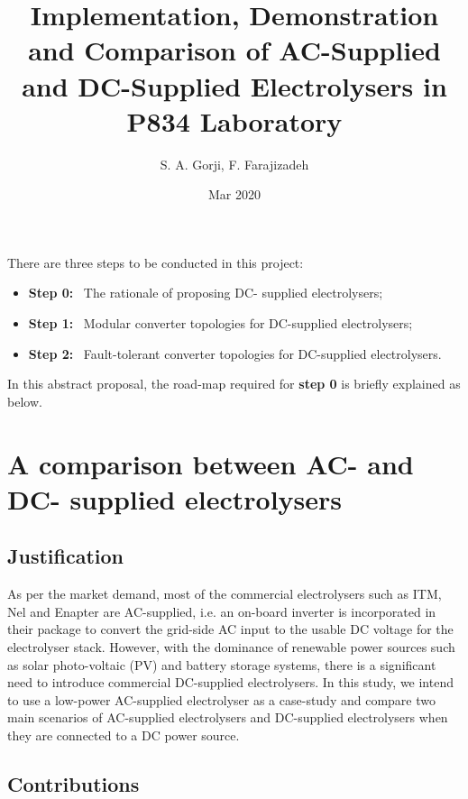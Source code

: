 \documentclass[1pt]{extarticle}
\title{Implementation, Demonstration and Comparison of AC-Supplied and DC-Supplied Electrolysers in P834 Laboratory}
\author{S. A. Gorji, F. Farajizadeh}
\date{Mar 2020}
\begin{document}
\maketitle

There are three steps to be conducted in this project:

\begin{itemize}
  \item \textbf{Step 0:}~ The rationale of proposing DC- supplied electrolysers;
  \item \textbf{Step 1:}~ Modular converter topologies for DC-supplied electrolysers;
  \item \textbf{Step 2:}~ Fault-tolerant converter topologies for DC-supplied electrolysers.
\end{itemize}

In this abstract proposal, the road-map required for \textbf{step 0} is briefly explained as below.

\section{A comparison between AC- and DC- supplied electrolysers}

\subsection{Justification}
As per the market demand, most of the commercial electrolysers such as ITM\cite{ITM}, Nel\cite{Nel} and Enapter\cite{Enapter} are AC-supplied, i.e. an on-board inverter is incorporated in their package to convert the grid-side AC input to the usable DC voltage for the electrolyser stack. However, with the dominance of renewable power sources such as solar photo-voltaic (PV) and battery storage systems, there is a significant need to introduce commercial DC-supplied electrolysers. In this study, we intend to use a low-power AC-supplied electrolyser\cite{QL500}  as a case-study and compare two main scenarios of AC-supplied electrolysers and DC-supplied electrolysers when they are connected to a DC power source. 


\subsection{Contributions}
\end{document}
